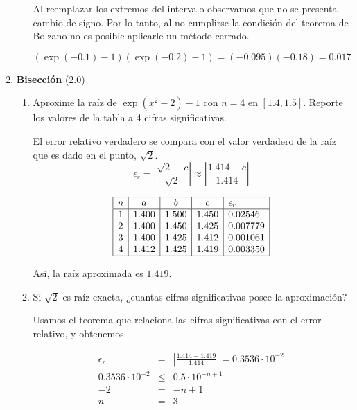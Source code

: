 \documentclass[12pt]{article}
\begin{document}
\begin{enumerate}[leftmargin=*,widest=9]
\begin{enumerate}[label=\alph*]
   Al reemplazar los extremos del intervalo observamos que no se presenta cambio de signo. Por lo tanto, al no cumplirse la condición del teorema de Bolzano no es posible aplicarle un método cerrado.
    
   \[ (\exp(-0.1)-1)(\exp(-0.2)-1) = (-0.095)(-0.18) = 0.017 \]
    
    \end{enumerate}
   
    \item \textbf{Bisección} ($2.0$)
    
    \begin{enumerate}[label=\alph*]

    \item Aproxime la raíz de $\exp (x^2 - 2) - 1$ con $n=4$ en $\left[1.4, 1.5\right]$. Reporte los valores de la tabla a 4 cifras significativas.
    
    El error relativo verdadero se compara con el valor verdadero de la raíz que es dado en el punto, $\sqrt{2}$.
    \[ \epsilon_r = \left| \frac{\sqrt{2} - c}{\sqrt{2}} \right| \approx \left|\frac{1.414 - c}{1.414} \right| \]
    
    \[
    \begin{array}{|c|c|c|c|l|}
    \hline
    n & a & b & c & \epsilon_r \\
    \hline
 1 & 1.400 & 1.500 & 1.450 & 0.02546\\
 2 & 1.400 & 1.450 & 1.425 & 0.007779\\
 3 & 1.400 & 1.425 & 1.412 & 0.001061 \\
 4 & 1.412 & 1.425 & 1.419 & 0.003350 \\
    \hline
    \end{array}
    \]
    
    Así, la raíz aproximada es $1.419$.
    
    
    \item Si $\sqrt{2}$ es raíz exacta, ¿cuantas cifras significativas posee la aproximación?
    
    Usamos el teorema que relaciona las cifras significativas con el error relativo, y obtenemos
    
    \begin{eqnarray*}
    \epsilon_r  & = & \left| \frac{1.414 - 1.419}{1.414} \right| = 0.3536\cdot 10^{-2}  \\
    0.3536\cdot 10^{-2} & \leq & 0.5 \cdot 10^{-n + 1} \\
    -2 & = & -n + 1 \\
    n & = & 3
    \end{eqnarray*}
    

\end{enumerate}
\end{enumerate}
\end{document}
